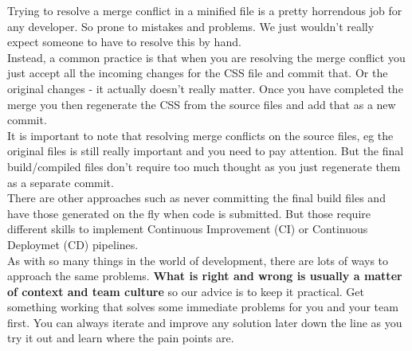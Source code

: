Trying to resolve a merge conflict in a minified file is a pretty horrendous job for any developer. So prone to mistakes and problems. We just wouldn't really expect someone to have to resolve this by hand.
\\

Instead, a common practice is that when you are resolving the merge conflict you just accept all the incoming changes for the CSS file and commit that. Or the original changes - it actually doesn't really matter. Once you have completed the merge you then regenerate the CSS from the source files and add that as a new commit.
\\

It is important to note that resolving merge conflicts on the source files, eg the original files is still really important and you need to pay attention. But the final build/compiled files don't require too much thought as you just regenerate them as a separate commit.
\\

There are other approaches such as never committing the final build files and have those generated on the fly when code is submitted. But those require different skills to implement Continuous Improvement (CI) or Continuous Deploymet (CD) pipelines. 
\\

As with so many things in the world of development, there are lots of ways to approach the same problems. \textbf{What is right and wrong is usually a matter of context and team culture} so our advice is to keep it practical. Get something working that solves some immediate problems for you and your team first. You can always iterate and improve any solution later down the line as you try it out and learn where the pain points are.
\\